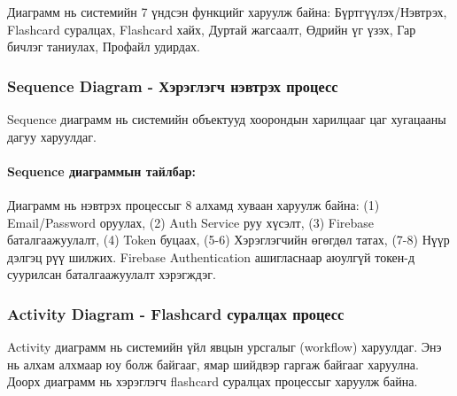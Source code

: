 Диаграмм нь системийн 7 үндсэн функцийг харуулж байна: Бүртгүүлэх/Нэвтрэх, Flashcard суралцах, Flashcard хайх, Дуртай жагсаалт, Өдрийн үг үзэх, Гар бичлэг таниулах, Профайл удирдах.

\subsubsection{Sequence Diagram - Хэрэглэгч нэвтрэх процесс}

Sequence диаграмм нь системийн объектууд хоорондын харилцааг цаг хугацааны дагуу харуулдаг.

\figSequenceDiagram

\paragraph{Sequence диаграммын тайлбар:}

Диаграмм нь нэвтрэх процессыг 8 алхамд хуваан харуулж байна: (1) Email/Password оруулах, (2) Auth Service руу хүсэлт, (3) Firebase баталгаажуулалт, (4) Token буцаах, (5-6) Хэрэглэгчийн өгөгдөл татах, (7-8) Нүүр дэлгэц рүү шилжих. Firebase Authentication ашигласнаар аюулгүй токен-д суурилсан баталгаажуулалт хэрэгждэг.

\subsubsection{Activity Diagram - Flashcard суралцах процесс}

Activity диаграмм нь системийн үйл явцын урсгалыг (workflow) харуулдаг. Энэ нь алхам алхмаар юу болж байгааг, ямар шийдвэр гаргаж байгааг харуулна. Доорх диаграмм нь хэрэглэгч flashcard суралцах процессыг харуулж байна.

\figActivityDiagram

